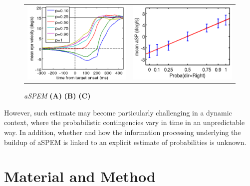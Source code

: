 \documentclass[profile,final,english, draft]{article}%
\begin{document}
\begin{figure}%
\begin{tabular}{cc} 
    \includegraphics[width=.49\linewidth]{image_anna_1} & 	\includegraphics[width=.49\linewidth]{image_anna_2}
\end{tabular}
\caption{\emph{aSPEM} \textbf{(A)} 
\textbf{(B)} 
\textbf{(C)}  }
\label{fig:intro}
\end{figure}


However, such estimate may become particularly challenging in a dynamic context, where the probabilistic contingencies vary in time in an unpredictable way. In addition, whether and how the information processing underlying the buildup of aSPEM is linked to an explicit estimate of probabilities is unknown.


\section{Material and Method}
\end{document}
